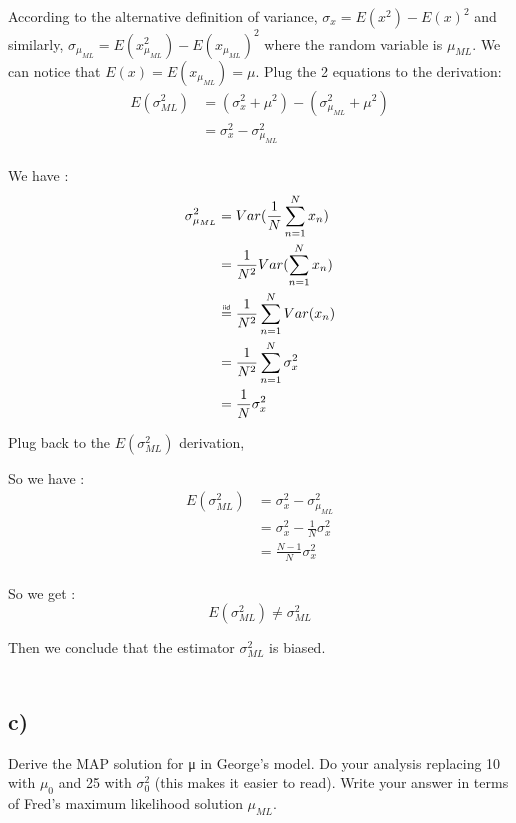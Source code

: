 \documentclass[12pt,twoside]{article}
\newcommand\myeq{\mathrel{\overset{\makebox[0pt]{\mbox{\normalfont\tiny\sffamily iid}}}{=}}}
\begin{document}
According to the alternative definition of variance, $\sigma_x = E(x^2) - E(x)^2$ and similarly, $\sigma_{\mu_{ML}} = E(x_{\mu_{ML}}^2) - E(x_{\mu_{ML}})^2$ where the random variable is $\mu_{ML}.$ We can notice that $E(x) = E(x_{\mu_{ML}}) = \mu$. Plug the 2 equations to the
derivation:
\begin{align*}
E(\sigma^2 _{ML})  &= (\sigma_x^2 + \mu^2) - (\sigma_{\mu_{ML}}^2 + \mu^2) \\
                   &= \sigma_x^2  - \sigma_{\mu_{ML}}^2  \\
\end{align*}

We have : 
\begin{align*}
\sigma_{\mu_{ML}}^2 &= Var(\frac{1}{N} \sum_{n=1}^{N} x_n) \\
                    &= \frac{1}{N^2}Var( \sum_{n=1}^{N} x_n) \\
                    & \myeq \frac{1}{N^2} \sum_{n=1}^{N} Var( x_n) \\
                    &= \frac{1}{N^2} \sum_{n=1}^{N} \sigma_x^2 \\
                    &= \frac{1}{N} \sigma_x^2 \\
\end{align*}

Plug back to the $E(\sigma^2 _{ML})$ derivation,

So we have : 
\begin{align*}
E(\sigma^2 _{ML}) &= \sigma_x^2  - \sigma_{\mu_{ML}}^2   \\
                  &= \sigma_x^2 - \frac{1}{N} \sigma_x^2\\
                  &= \frac{N-1}{N} \sigma_x^2\\
\end{align*}



So we get :
\begin{equation}
E(\sigma^2 _{ML}) \neq \sigma^2 _{ML}
\end{equation}

Then we conclude that the estimator $\sigma^2 _{ML}$ is biased.\\ \\

\subsection*{c)} Derive the MAP solution for μ in George’s model. Do your analysis replacing 10 with $\mu_0$ and 25 with $\sigma_0^2$ (this makes it easier to read). Write your answer in terms of Fred’s maximum likelihood solution $\mu_{ML}$.\\ \\
\end{document}
